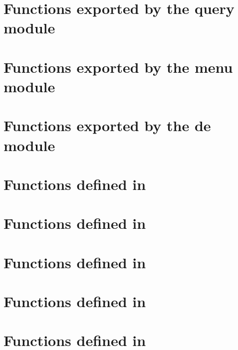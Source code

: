 \documentclass[english,a4paper,11pt,oldtoc,mctitle]{rapport3}
\begin{document}


\section{Functions exported by the query module}
\label{sec:queryref}



\section{Functions exported by the menu module}
\label{sec:queryref}



\section{Functions exported by the de module}
\label{sec:menuref}





\section{Functions defined in }
\label{sec:ioncorelibref}



\section{Functions defined in }
\label{sec:mplexfnsref}



\section{Functions defined in }
\label{sec:querylibref}



\section{Functions defined in }
\label{sec:delibref}



\section{Functions defined in }
\label{sec:menulibref}



\appendix



\printindex
\end{document}
